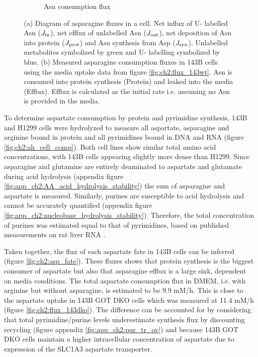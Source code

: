 \begin{figure}[ht]
\begin{subfigure}[b]{0.4\textwidth}
         \caption{Asn consumption flux}
         \label{fig:ch2:Asn_flux}
     \end{subfigure}
     \hspace{0.1\textwidth}
        \caption[Asparagine consumption fluxes.]{
        (a) Diagram of asparagine fluxes in a cell.
        Net influx of U-\hCi{} labelled Asn ($J_{\text{in}}$), net efflux of unlabelled Asn ($J_{\text{out}}$), net deposition of Asn into protein ($J_{\text{prot}}$) and Asn synthesis from Asp ($J_{\text{syn}}$).
        Unlabelled metabolites symbolized by green and U-\hCi{} labelling symbolized by blue.
        (b) Measured asparagine consumption fluxes in 143B cells using the media uptake data from figure \ref{fig:ch2:flux_143wt}.
        Asn is consumed into protein synthesis (Protein) and leaked into the media (Efflux).
        Efflux is calculated as the initial rate i.e. assuming no Asn is provided in the media.
        }
\end{figure}




To determine aspartate consumption by protein and pyrimidine synthesis, 143B and H1299 cells were hydrolyzed to measure all aspartate, asparagine and arginine bound in protein and all pyrimidines bound in DNA and RNA (figure \ref{fig:ch2:ah_cell_comp}).
Both cell lines show similar total amino acid concentrations, with 143B cells appearing slightly more dense than H1299.
Since asparagine and glutamine are entirely deaminated to aspartate and glutamate during acid hydrolysis (appendix figure \ref{fig:app_ch2:AA_acid_hydrolysis_stability}) the sum of asparagine and aspartate is measured.
Similarly, purines are susceptible to acid hydrolysis and cannot be accurately quantified (appendix figure \ref{fig:app_ch2:nucleobase_hydrolysis_stability}).
Therefore, the total concentration of purines was estimated equal to that of pyrimidines, based on published measurements on rat liver RNA \cite{Lipshitz1960-jw}.

Taken together, the flux of each aspartate fate in 143B cells can be inferred (figure \ref{fig:ch2:asp_fate}).
These fluxes shows that protein synthesis is the biggest consumer of aspartate but also that asparagine efflux is a large sink, dependent on media conditions.
The total aspartate consumption flux in DMEM, i.e. with arginine but without asparagine, is estimated to be 9.9 mM/h.
This is close to the aspartate uptake in 143B GOT DKO cells which was measured at 11.4 mM/h (figure \ref{fig:ch2:flux_143dko}).
The difference can be accounted for by considering that total pyrimidine/purine levels underestimate synthesis flux by discounting recycling (figure appendix \ref{fig:app_ch2:pur_tr_ov}) and because 143B GOT DKO cells maintain a higher intracellular concentration of aspartate due to expression of the SLC1A3 aspartate transporter.

